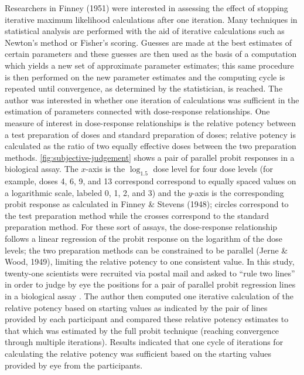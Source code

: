 \documentclass[print]{nuthesis}
\begin{document}
Researchers in Finney (1951) were interested in assessing the effect of stopping iterative maximum likelihood calculations after one iteration.
Many techniques in statistical analysis are performed with the aid of iterative calculations such as Newton's method or Fisher's scoring.
Guesses are made at the best estimates of certain parameters and these guesses are then used as the basis of a computation which yields a new set of approximate parameter estimates; this same procedure is then performed on the new parameter estimates and the computing cycle is repeated until convergence, as determined by the statistician, is reached.
The author was interested in whether one iteration of calculations was sufficient in the estimation of parameters connected with dose-response relationships.
One measure of interest in dose-response relationships is the relative potency between a test preparation of doses and standard preparation of doses; relative potency is calculated as the ratio of two equally effective doses between the two preparation methods.
\cref{fig:subjective-judgement} shows a pair of parallel probit responses in a biological assay.
The \(x\)-axis is the \(\log_{1.5}\) dose level for four dose levels (for example, doses 4, 6, 9, and 13 correspond correspond to equally spaced values on a logarithmic scale, labeled 0, 1, 2, and 3) and the \(y\)-axis is the corresponding probit response as calculated in Finney \& Stevens (1948); circles correspond to the test preparation method while the crosses correspond to the standard preparation method.
For these sort of assays, the dose-response relationship follows a linear regression of the probit response on the logarithm of the dose levels; the two preparation methods can be constrained to be parallel (Jerne \& Wood, 1949), limiting the relative potency to one consistent value.
In this study, twenty-one scientists were recruited via postal mail and asked to ``rule two lines'' in order to judge by eye the positions for a pair of parallel probit regression lines in a biological assay .
The author then computed one iterative calculation of the relative potency based on starting values as indicated by the pair of lines provided by each participant and compared these relative potency estimates to that which was estimated by the full probit technique (reaching convergence through multiple iterations).
Results indicated that one cycle of iterations for calculating the relative potency was sufficient based on the starting values provided by eye from the participants.
\end{document}
